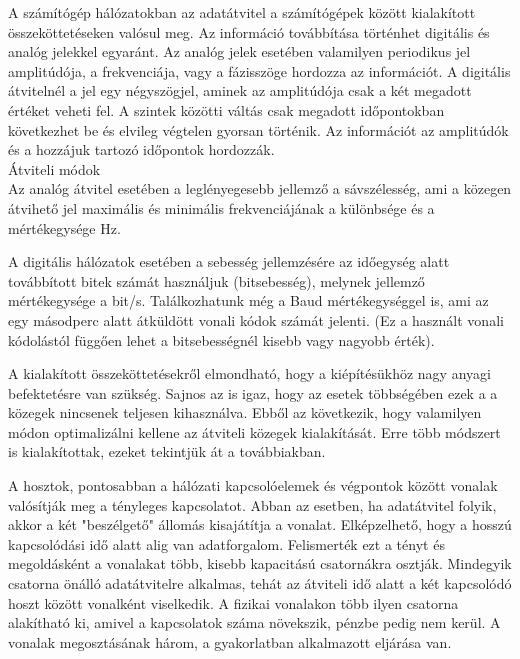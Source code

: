 \documentclass[12pt, a4paper]{article}
\begin{document}
\begin{enumerate}
A számítógép hálózatokban az adatátvitel a számítógépek között kialakított összeköttetéseken valósul meg. Az információ továbbítása történhet digitális és analóg jelekkel egyaránt. Az analóg jelek esetében valamilyen periodikus jel amplitúdója, a frekvenciája, vagy a fázisszöge hordozza az információt. A digitális átvitelnél a jel egy négyszögjel, aminek az amplitúdója csak a két megadott értéket veheti fel. A szintek közötti váltás csak megadott időpontokban következhet be és elvileg végtelen gyorsan történik. Az információt az amplitúdók és a hozzájuk tartozó időpontok hordozzák.
\\Átviteli módok\\
Az analóg átvitel esetében a leglényegesebb jellemző a sávszélesség, ami a közegen átvihető jel maximális és minimális frekvenciájának a különbsége és a mértékegysége Hz.

A digitális hálózatok esetében a sebesség jellemzésére az időegység alatt továbbított bitek számát használjuk (bitsebesség), melynek jellemző mértékegysége a bit/s. Találkozhatunk még a Baud mértékegységgel is, ami az egy másodperc alatt átküldött vonali kódok számát jelenti. (Ez a használt vonali kódolástól függően lehet a bitsebességnél kisebb vagy nagyobb érték).

A kialakított összeköttetésekről elmondható, hogy a kiépítésükhöz nagy anyagi befektetésre van szükség. Sajnos az is igaz, hogy az esetek többségében ezek a a közegek nincsenek teljesen kihasználva. Ebből az következik, hogy valamilyen módon optimalizálni kellene az átviteli közegek kialakítását. Erre több módszert is kialakítottak, ezeket tekintjük át a továbbiakban.

A hosztok, pontosabban a hálózati kapcsolóelemek és végpontok között vonalak valósítják meg a tényleges kapcsolatot. Abban az esetben, ha adatátvitel folyik, akkor a két "beszélgető" állomás kisajátítja a vonalat. Elképzelhető, hogy a hosszú kapcsolódási idő alatt alig van adatforgalom. Felismerték ezt a tényt és megoldásként a vonalakat több, kisebb kapacitású csatornákra osztják. Mindegyik csatorna önálló adatátvitelre alkalmas, tehát az átviteli idő alatt a két kapcsolódó hoszt között vonalként viselkedik. A fizikai vonalakon több ilyen csatorna alakítható ki, amivel a kapcsolatok száma növekszik, pénzbe pedig nem kerül. A vonalak megosztásának három, a gyakorlatban alkalmazott eljárása van.


\end{enumerate}
\end{document}
